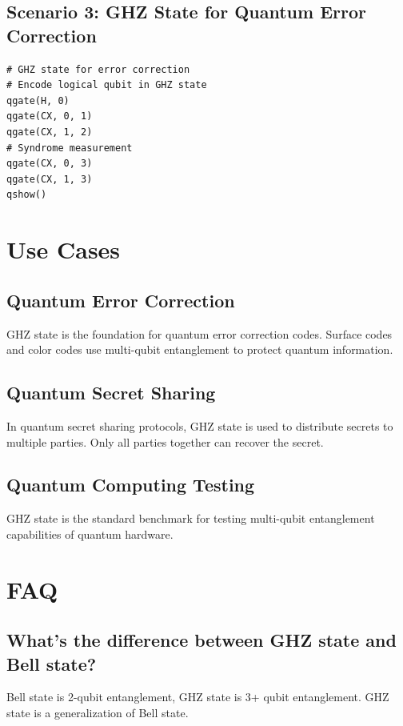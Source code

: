 \documentclass[12pt,a4paper]{article}
\begin{document}
\subsection{Scenario 3: GHZ State for Quantum Error Correction}

\begin{verbatim}
# GHZ state for error correction
# Encode logical qubit in GHZ state
qgate(H, 0)
qgate(CX, 0, 1)
qgate(CX, 1, 2)
# Syndrome measurement
qgate(CX, 0, 3)
qgate(CX, 1, 3)
qshow()
\end{verbatim}

\section{Use Cases}

\subsection{Quantum Error Correction}

GHZ state is the foundation for quantum error correction codes. Surface codes and color codes use multi-qubit entanglement to protect quantum information.

\subsection{Quantum Secret Sharing}

In quantum secret sharing protocols, GHZ state is used to distribute secrets to multiple parties. Only all parties together can recover the secret.

\subsection{Quantum Computing Testing}

GHZ state is the standard benchmark for testing multi-qubit entanglement capabilities of quantum hardware.

\section{FAQ}

\subsection{What's the difference between GHZ state and Bell state?}

Bell state is 2-qubit entanglement, GHZ state is 3+ qubit entanglement. GHZ state is a generalization of Bell state.
\end{document}
